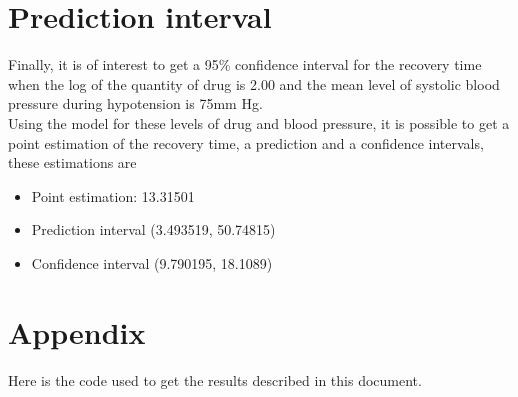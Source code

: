 \documentclass{article}
\begin{document}
\section{Prediction interval}
Finally, it is of interest to get a 95\% confidence interval for the recovery time when the  log of the quantity of drug is 2.00 and the mean level of systolic blood pressure during hypotension is 75mm Hg.
\\
Using the model for these levels of drug and blood pressure, it is possible to get a point estimation of the recovery time, a prediction and a confidence intervals, these estimations are

\begin{itemize}
    \item Point estimation: 13.31501
    \item Prediction interval (3.493519, 50.74815)
    \item Confidence interval (9.790195, 18.1089)
\end{itemize}

\newpage
\section{Appendix}

Here is the code used to get the results described in this document. 
\end{document}
